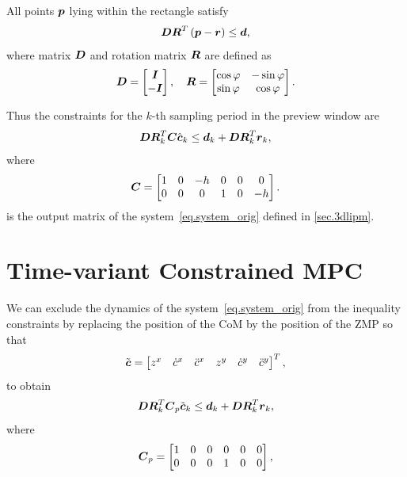 All points $\mbox{\boldmath $p$}$ lying within the rectangle satisfy
$$
\mbox{\boldmath $D$}\mbox{\boldmath $R$}^T\left(\mbox{\boldmath $p$} - \mbox{\boldmath $r$} \right) \leq \mbox{\boldmath $d$},
$$
where matrix $\mbox{\boldmath $D$}$ and rotation matrix $\mbox{\boldmath $R$}$ are defined as
$$
\mbm{D} = 
\begin{bmatrix}
    \mbm{I}\\
    -\mbm{I}
\end{bmatrix}, \quad
%
\mbm{R} =
\begin{bmatrix}
    \cos\varphi & -\sin\varphi \\
    \sin\varphi & \cos\varphi
\end{bmatrix}.
$$

Thus the constraints for the $k$-th sampling period in the preview window are
\begin{equation}
\mbox{\boldmath $D$}\mbox{\boldmath $R$}^T_k \mbox{\boldmath $C$} \hat{\mbox{\boldmath $c$}}_k \leq \mbox{\boldmath $d$}_{k} + \mbox{\boldmath $D$}\mbox{\boldmath $R$}^T_k \mbox{\boldmath $r$}_k,
\end{equation}
where 
$$
\mbox{\boldmath $C$} = 
\begin{bmatrix}
    1 & 0 & -h & 0 & 0 & 0\\ 
    0 & 0 & 0  & 1 & 0 & -h\\
\end{bmatrix}.
$$
is the output matrix of the system~\ref{eq.system_orig} defined in \cref{sec.3dlipm}.


\section{Time-variant Constrained MPC}\label{sec.timevarsys}
We can exclude the dynamics of the system~\eqref{eq.system_orig} from the inequality 
constraints by replacing the position of the \ac{CoM} by the position of the \ac{ZMP} 
so that
\begin{equation}\label{eq.substitution1}
\tilde{\mbm{c}} = 
\begin{bmatrix} z^x & \dot{c}^x & \ddot{c}^x & z^y & \dot{c}^y & \ddot{c}^y \end{bmatrix}^T,
\end{equation}
to obtain
\begin{equation}\label{eq.constraints}
\mbm{D}\mbm{R}^T_k \mbm{C}_p \tilde{\mbm{c}}_k \leq \mbm{d}_{k} + \mbm{D}\mbm{R}^T_k \mbm{r}_k,
\end{equation}
where
$$
\mbox{\boldmath $C$}_p =
\begin{bmatrix}
    1 & 0 & 0 & 0 & 0 & 0 \\
    0 & 0 & 0 & 1 & 0 & 0 \\
\end{bmatrix},
$$

